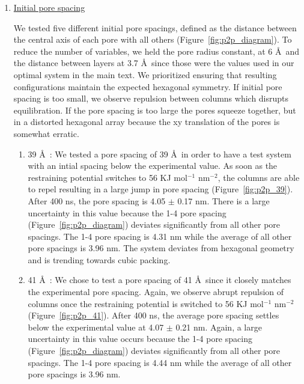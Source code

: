 \documentclass{article}
\begin{document}
  \begin{enumerate}

	  \item \underline{Initial pore spacing}

	  We tested five different initial pore spacings, defined as the
	  distance between the central axis of each pore with all others
	  (Figure~\ref{fig:p2p_diagram}). To reduce the number of variables, we held the
	  pore radius constant, at 6 \AA~and the distance between layers at 3.7 \AA~since
	  those were the values used in our optimal system in the main text. We
	  prioritized ensuring that resulting configurations maintain the expected
	  hexagonal symmetry. If initial pore spacing is too small, we observe repulsion
	  between columns which disrupts equilibration. If the pore spacing is too large
	  the pores squeeze together, but in a distorted hexagonal array because the xy
	  translation of the pores is somewhat erratic. 


	  \begin{enumerate}

		\item 39 \AA~: We tested a pore spacing of 39 \AA~in order to
		have a test system with an intial spacing below the experimental value. As soon
		as the restraining potential switches to 56 KJ mol$^{-1}$ nm$^{-2}$, the
		columns are able to repel resulting in a large jump in pore spacing
		(Figure~\ref{fig:p2p_39}). After 400 ns, the pore spacing is 4.05 $\pm$ 0.17 nm.
		There is a large uncertainty in this value because the 1-4 pore spacing
		(Figure~\ref{fig:p2p_diagram}) deviates significantly from all other pore
		spacings. The 1-4 pore spacing is 4.31 nm while the average of all other pore
		spacings is 3.96 nm. The system deviates from hexagonal geometry and is trending
                towards cubic packing.

		\item 41 \AA~: We chose to test a pore spacing of 41 \AA~since
		it closely matches the experimental pore spacing. Again, we observe abrupt
		repulsion of columns once the restraining potential is switched to 56 KJ
		mol$^{-1}$ nm$^{-2}$ (Figure~\ref{fig:p2p_41}). After 400 ns, the
		average pore spacing settles below the experimental value at 4.07 $\pm$ 0.21
		nm. Again, a large uncertainty in this value occurs because the 1-4 pore spacing
		(Figure~\ref{fig:p2p_diagram}) deviates significantly from all other pore
		spacings. The 1-4 pore spacing is 4.44 nm while the average of all other pore
		spacings is 3.96 nm. 


\end{enumerate}
\end{enumerate}
\end{document}

